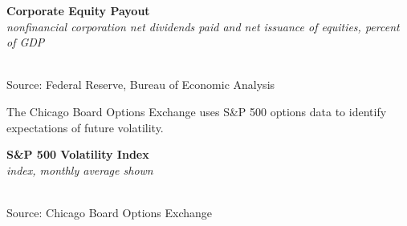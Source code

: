 \documentclass{report}
\makeatletter
\newcommand{\tbllink}[1]{\href{https://raw.githubusercontent.com/bdecon/US-chartbook/master/chartbook/data/#1}{\faTable}}
\newcommand*\short[1]{\expandafter\@gobbletwo\number\numexpr#1\relax}
\newcommand{\sbar}[4]{
		\addplot[ybar stacked, bar width=2.7pt, draw opacity=0, fill=#1] 
			table [x=#2, y=#3, col sep=comma]{#4};}
\newcommand{\dateaxisticks}{
		date coordinates in=x, axis line style={draw=none},
		xmax={2020-02-01},
		max space between ticks=40,	    
		xtick={{1990-01-01}, {1992-01-01}, {1994-01-01}, 
			{1996-01-01}, {1998-01-01}, {2000-01-01}, 
			{2002-01-01}, {2004-01-01}, {2006-01-01},
			{2008-01-01}, {2010-01-01}, {2012-01-01}, {2014-01-01},
		    {2016-01-01}, {2018-01-01}, {2020-01-01}},
		minor xtick={{1989-01-01}, {1991-01-01}, {1993-01-01},
			{1995-01-01}, {1997-01-01}, {1999-01-01}, 
			{2001-01-01}, {2003-01-01}, {2005-01-01}, {2007-01-01},
		    {2009-01-01}, {2011-01-01}, {2013-01-01}, {2015-01-01},
		    {2017-01-01}, {2019-01-01}},
		enlarge y limits={0.06}, enlarge x limits={0.01},
		}
\newcommand{\bbar}[2]{extra #1 ticks = {{#2}}, extra #1 tick labels = ,
		extra #1 tick style = {grid=major, grid style={thick, black!25}},}
\newcommand{\stdline}[4]{\addplot[very thick, no markers, color=#1] 
		table [x=#2, y=#3, col sep=comma] {#4};	}
\newcommand{\rbars}{
		\fill[color=black!10] (axis cs:{1990-07-01},\pgfkeysvalueof{/pgfplots/ymin}) rectangle 
			(axis cs:{1991-03-01}, \pgfkeysvalueof{/pgfplots/ymax});
		\fill[color=black!10] (axis cs:{2007-12-01},\pgfkeysvalueof{/pgfplots/ymin}) rectangle 
			(axis cs:{2009-07-01}, \pgfkeysvalueof{/pgfplots/ymax});
		\fill[color=black!10] (axis cs:{2001-03-01},\pgfkeysvalueof{/pgfplots/ymin}) rectangle 
			(axis cs:{2001-11-01}, \pgfkeysvalueof{/pgfplots/ymax});}
\makeatother
\begin{document}
{{{{\begin{minipage}{0.76\textwidth}
\vspace{2mm}

\noindent \normalsize \textbf{Corporate Equity Payout}\\
\footnotesize{\textit{nonfinancial corporation net dividends paid and net issuance of equities, percent of GDP}}\\
\noindent \hspace*{-2mm} \\
\footnotesize{Source: Federal Reserve, Bureau of Economic Analysis} \hfill \tbllink{eq_payout.csv}\\

\end{minipage}

\newpage

\begin{minipage}{0.76\textwidth}


\small The Chicago Board Options Exchange uses S\&P 500 options data to identify expectations of future volatility. \\

\vspace{2mm}

\noindent \normalsize \textbf{S\&P 500 Volatility Index}\\
\footnotesize{\textit{index, monthly average shown}}\\ 
\noindent \hspace*{-2mm} \\
\footnotesize{Source: Chicago Board Options Exchange} \hfill \tbllink{vix.csv}\\

\vspace{4mm}


\end{minipage}}}}}
\end{document}
